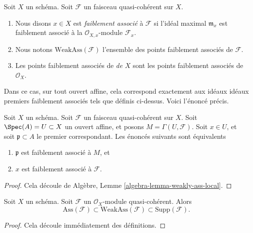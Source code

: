 \begin{definition}
\label{definition-weakly-associated}
Soit  $X$  un schéma. Soit  $\mathcal{F}$  un faisceau quasi-cohérent sur
 $X$.
\begin{enumerate}
\item Nous disons  $x \in X$  est  {\it faiblement
associé} à $\mathcal{F}$ si l'idéal maximal $\mathfrak m_x$ est faiblement
associé à la $\mathcal{O}_{X, x}$-module $\mathcal{F}_x$.
\item Nous notons  $\text{WeakAss}(\mathcal{F})$  l'ensemble des points faiblement associés de
 $\mathcal{F}$.
\item Les points faiblement associés de  {\it  de
 $X$}  sont les points faiblement associés de  $\mathcal{O}_X$.
\end{enumerate}
\end{definition}

\noindent
Dans ce cas, sur tout ouvert affine, cela correspond exactement aux idéaux idéaux
premiers faiblement associés tels que définis ci-dessus. Voici l'énoncé précis.

\begin{lemma}
\label{lemma-weakly-associated-affine-open}
Soit  $X$  un schéma. Soit  $\mathcal{F}$  un faisceau quasi-cohérent sur
 $X$. Soit  $\Spec(A) = U \subset X$  un ouvert affine, et posons  $M = \Gamma(U, \mathcal{F})$. Soit
 $x \in U$, et soit  $\mathfrak p \subset A$  le premier correspondant. Les énoncés suivants
sont équivalents
\begin{enumerate}
\item $\mathfrak p$  est faiblement associé à  $M$, et
\item $x$  est faiblement associé à  $\mathcal{F}$.
\end{enumerate}
\end{lemma}

\begin{proof}
Cela découle de Algèbre, Lemme  \ref{algebra-lemma-weakly-ass-local}.
\end{proof}

\begin{lemma}
\label{lemma-weakly-ass-support}
Soit  $X$  un schéma. Soit  $\mathcal{F}$  un  $\mathcal{O}_X$-module
quasi-cohérent. Alors
$$
\text{Ass}(\mathcal{F}) \subset \text{WeakAss}(\mathcal{F}) \subset
\text{Supp}(\mathcal{F}).
$$
\end{lemma}

\begin{proof}
Cela découle immédiatement des définitions.
\end{proof}

